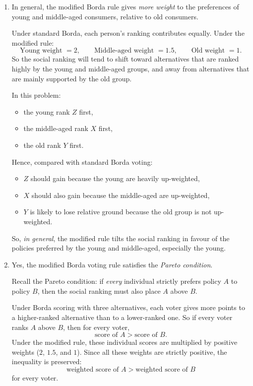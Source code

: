 \documentclass[12pt]{article}
\begin{document}
\begin{enumerate}[label=(\alph*)]
    \item
    In general, the modified Borda rule gives \emph{more weight} to the preferences of young and middle-aged consumers, relative to old consumers.

    Under standard Borda, each person's ranking contributes equally. Under the modified rule:
    \[
    \text{Young weight }=2,
    \qquad
    \text{Middle-aged weight }=1.5,
    \qquad
    \text{Old weight }=1.
    \]
    So the social ranking will tend to shift toward alternatives that are ranked highly by the young and middle-aged groups, and away from alternatives that are mainly supported by the old group.

    In this problem:
    \begin{itemize}
        \item the young rank \(Z\) first,
        \item the middle-aged rank \(X\) first,
        \item the old rank \(Y\) first.
    \end{itemize}

    Hence, compared with standard Borda voting:
    \begin{itemize}
        \item \(Z\) should gain because the young are heavily up-weighted,
        \item \(X\) should also gain because the middle-aged are up-weighted,
        \item \(Y\) is likely to lose relative ground because the old group is not up-weighted.
    \end{itemize}

    So, \emph{in general}, the modified rule tilts the social ranking in favour of the policies preferred by the young and middle-aged, especially the young.

    \item
    Yes, the modified Borda voting rule satisfies the \emph{Pareto condition}.

    Recall the Pareto condition: if \emph{every} individual strictly prefers policy \(A\) to policy \(B\), then the social ranking must also place \(A\) above \(B\).

    Under Borda scoring with three alternatives, each voter gives more points to a higher-ranked alternative than to a lower-ranked one. So if every voter ranks \(A\) above \(B\), then for every voter,
    \[
    \text{score of }A > \text{score of }B.
    \]
    Under the modified rule, these individual scores are multiplied by positive weights (\(2\), \(1.5\), and \(1\)). Since all these weights are strictly positive, the inequality is preserved:
    \[
    \text{weighted score of }A > \text{weighted score of }B
    \]
    for every voter.


\end{enumerate}
\end{document}
